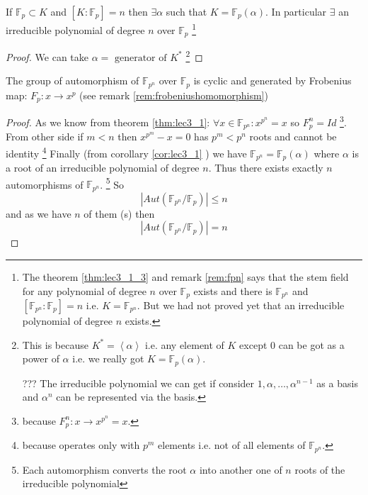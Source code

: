 \begin{corollary}
  If $\mathbb{F}_p \subset K$ and
  $\left[K:\mathbb{F}_p\right] = n$ then $\exists \alpha$ such that
  $K = \mathbb{F}_p\left(\alpha\right)$. In particular $\exists$ an
  irreducible polynomial of degree $n$ over $\mathbb{F}_p$
  \footnote{
    The theorem \ref{thm:lec3_1_3} and remark \ref{rem:fpn} says that
    the stem field for any 
    polynomial of degree $n$ over $\mathbb{F}_p$ exists and there is
    $\mathbb{F}_{p^n}$ and
    $\left[\mathbb{F}_{p^n}:\mathbb{F}_{p}\right] = n$ i.e.
    $K = \mathbb{F}_{p^n}$.
    But we had not proved yet that an
    irreducible polynomial of degree $n$ exists.
  }
  \begin{proof}
    We can take $\alpha = \mbox{ generator of } K^*$
    \footnote{
      This is because
      $K^* = \left<\alpha\right>$ i.e. any element of $K$ except $0$
      can be got as a power of $\alpha$ i.e. we really got
      $K = \mathbb{F}_p\left(\alpha\right)$.

      ??? The irreducible
      polynomial we can get if consider $1, \alpha, \dots,
      \alpha^{n-1}$ as a basis and $\alpha^n$ can be represented via
      the basis.
      }
  \end{proof}
  \label{cor:lec3_1}
\end{corollary}

\begin{corollary}
  The group of automorphism of $\mathbb{F}_{p^n}$ over
  $\mathbb{F}_{p}$ is cyclic and generated by Frobenius map:
  $F_p: x \to x^p$
  (see remark \ref{rem:frobeniushomomorphism}) 
  \begin{proof}
    As we know from theorem \ref{thm:lec3_1}:
    $\forall x \in \mathbb{F}_{p^n}: x^{p^n} = x$ so
    $F_p^n = Id$
    \footnote{
      because $F_p^n: x \to x^{p^n} = x$.
    }.
    From other side if $m < n$ then
    $x^{p^m} -x =0$ has $p^m < p^n$ roots and cannot be identity
    \footnote{
      because operates only with $p^m$ elements i.e. not of all
      elements of $\mathbb{F}_{p^n}$.
    }
    Finally (from corollary \ref{cor:lec3_1} ) we have
    $\mathbb{F}_{p^n} = \mathbb{F}_p\left(\alpha\right)$ where
    $\alpha$ is a root of an irreducible polynomial of degree
    $n$. Thus there exists exactly $n$ automorphisms of
    $\mathbb{F}_{p^n}$.
    \footnote{
      Each automorphism converts the root $\alpha$ into another one
      of $n$ roots of the irreducible polynomial
    }
    So
    \[
    \left|
    Aut\left(
    \mathbb{F}_{p^n}/\mathbb{F}_{p}
    \right)
    \right| \le n
    \]
    and as we have $n$ of them (s) then
    \[
    \left|
    Aut\left(
    \mathbb{F}_{p^n}/\mathbb{F}_{p}
    \right)
    \right| = n
    \]      
  \end{proof}
  \label{cor:lec3_2}
\end{corollary}

